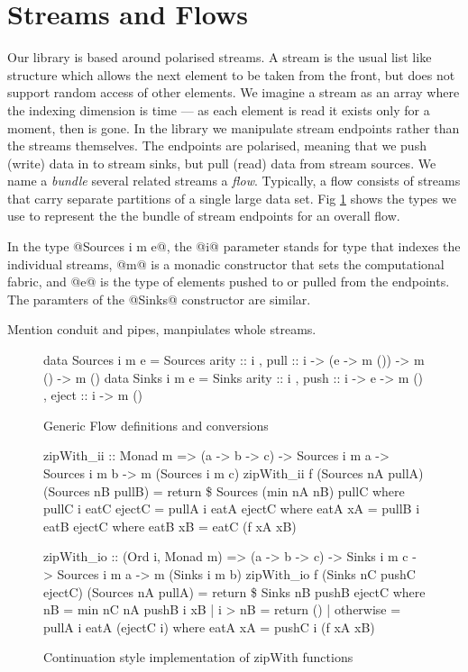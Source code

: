 
\clearpage
\section{Streams and Flows}

Our library is based around polarised streams. A stream is the usual list like structure which allows the next element to be taken from the front, but does not support random access of other elements. We imagine a stream as an array where the indexing dimension is time --- as each element is read it exists only for a moment, then is gone. In the library we manipulate stream endpoints rather than the streams themselves. The endpoints are polarised, meaning that we push (write) data in to stream sinks, but pull (read) data from stream sources. We name a \emph{bundle} several related streams a \emph{flow}. Typically, a flow consists of streams that carry separate partitions of a single large data set. Fig \ref{f:GenericFlows} shows the types we use to represent the the bundle of stream endpoints for an overall flow.

In the type @Sources i m e@, the @i@ parameter stands for type that indexes the individual streams, @m@ is a monadic constructor that sets the computational fabric, and @e@ is the type of elements pushed to or pulled from the endpoints. The paramters of the @Sinks@ constructor are similar. 

Mention conduit and pipes, manpiulates whole streams.

\begin{figure}
\begin{code}
data Sources i m e 
   = Sources { arity :: i
             , pull  :: i -> (e -> m ()) -> m () 
                                         -> m () }
data Sinks   i m e 
   = Sinks   { arity :: i
             , push  :: i -> e -> m ()
             , eject :: i -> m () }
\end{code}
\label{f:GenericFlows}
\caption{Generic Flow definitions and conversions}
\end{figure}

\begin{figure}
\begin{code}
zipWith_ii :: Monad m => (a -> b -> c)
           -> Sources i m a -> Sources i m b -> m (Sources i m c)
zipWith_ii f (Sources nA pullA) (Sources nB pullB)
 = return \$ Sources (min nA nB) pullC
 where  pullC i eatC ejectC
         = pullA i eatA ejectC
         where  eatA xA = pullB i eatB ejectC
                 where  eatB xB = eatC (f xA xB)

zipWith_io :: (Ord i, Monad m) => (a -> b -> c)
           -> Sinks i m c -> Sources i m a -> m (Sinks i m b)
zipWith_io f (Sinks nC pushC ejectC) (Sources nA pullA)
 = return \$ Sinks nB pushB ejectC
 where  nB = min nC nA
        pushB i xB 
         | i > nB       = return ()
         | otherwise    = pullA i eatA (ejectC i)
         where  eatA xA = pushC i (f xA xB)
\end{code}
\caption{Continuation style implementation of zipWith functions}
\end{figure}

